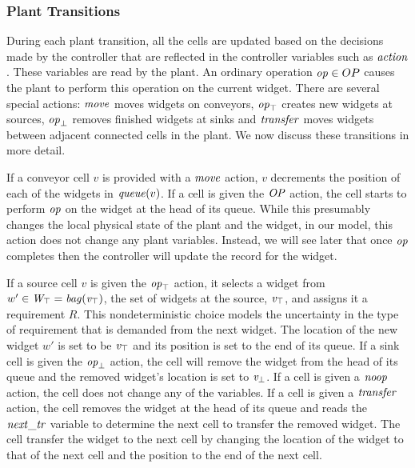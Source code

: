 \begin{figure}[!ht]
	\centering
\end{figure}

\subsubsection*{Plant Transitions}
During each plant transition, all the cells are updated  based on the decisions made by the controller that are reflected in the controller variables such as $\mathit{action}$. These variables are read by the plant.
An ordinary operation $\mathit{op} \in OP$ causes the plant to perform this operation on the current widget. There are several special actions: $\mathit{move}$  moves widgets on conveyors, $\mathit{op}_\top$ creates new widgets at sources, $\mathit{op}_\bot$ removes finished widgets at sinks and $\mathit{transfer}$ moves widgets between adjacent connected cells in the plant. We now discuss these transitions in more detail.

If a conveyor cell $v$ is provided with a $\mathit{move}$ action, $v$ decrements the position of each of the widgets in $\mathit{queue}(v)$.
If a cell is given the $\mathit{OP}$ action, the cell starts to perform $\mathit{op}$ on the widget at the head of its queue. While this presumably changes the local physical state of the plant and the widget, in our model, this action does not change any plant variables. Instead, we will see later that once $\mathit{op}$ completes then the controller will update the record for the widget. 

If a source cell $v$ is given the $\mathit{op}_\top$ action, it selects a widget from $w' \in \mathit{W}_\top = \mathit{bag}(\mathit{v}_\top)$, the set of widgets at the source,  $\mathit{v}_\top$, and assigns it a requirement $R$. This nondeterministic choice models the uncertainty in the type of requirement that is demanded from the next widget. The location of the new widget $w'$ is set to be $\mathit{v}_\top$ and its position is set to the end of its queue.
%
If a sink cell is given the $\mathit{op}_\bot$ action, the cell will remove the widget from the head of its queue and the removed widget's location is set to  $\mathit{v}_\bot$.
%
If a cell is given a $\mathit{noop}$ action, the cell does not change any of the variables.
%
If a cell is given a $\mathit{transfer}$ action, the cell removes the widget at the head of its queue and reads the $\mathit{next\_tr}$ variable to determine the next cell to transfer the removed widget. The cell transfer the widget to the next cell by changing the location of the widget to that of the next cell and the position to the end of the next cell.


